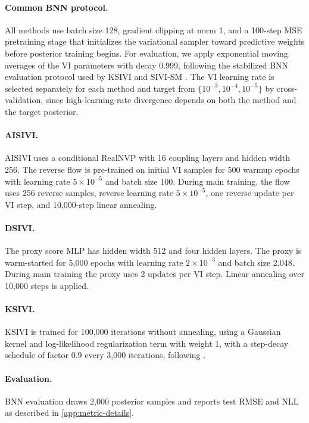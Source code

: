 \paragraph{Common BNN protocol.}
All methods use batch size 128, gradient clipping at norm 1, and a 100-step MSE pretraining stage that initializes the variational sampler toward predictive weights before posterior training begins.  For evaluation, we apply exponential moving averages of the VI parameters with decay 0.999, following the stabilized BNN evaluation protocol used by KSIVI and SIVI-SM \citep{cheng2024kernel,yu2023semi}.  The VI learning rate is selected separately for each method and target from $\{10^{-3}, 10^{-4}, 10^{-5}\}$ by cross-validation, since high-learning-rate divergence depends on both the method and the target posterior.

\paragraph{AISIVI.}
AISIVI uses a conditional RealNVP with 16 coupling layers and hidden width 256.  The reverse flow is pre-trained on initial VI samples for 500 warmup epochs with learning rate $5 \times 10^{-5}$ and batch size 100.  During main training, the flow uses 256 reverse samples, reverse learning rate $5 \times 10^{-5}$, one reverse update per VI step, and 10,000-step linear annealing.

\paragraph{DSIVI.}
The proxy score MLP has hidden width 512 and four hidden layers.  The proxy is warm-started for 5,000 epochs with learning rate $2 \times 10^{-3}$ and batch size 2,048.  During main training the proxy uses 2 updates per VI step.  Linear annealing over 10,000 steps is applied.

\paragraph{KSIVI.}
KSIVI is trained for 100,000 iterations without annealing, using a Gaussian kernel and log-likelihood regularization term with weight 1, with a step-decay schedule of factor 0.9 every 3,000 iterations, following \citet{cheng2024kernel}.

\paragraph{Evaluation.}
BNN evaluation draws 2,000 posterior samples and reports test RMSE and NLL as described in \cref{app:metric-details}.



